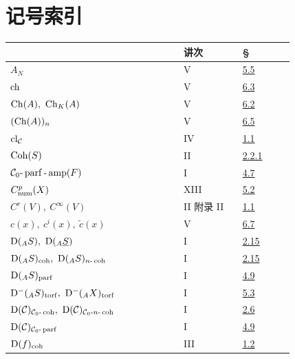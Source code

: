 \newpage
{}\section*{记号索引}
\begingroup\small
\begin{longtable}{@{}>{\raggedright\arraybackslash}p{0.50\linewidth}>{\raggedright\arraybackslash}p{0.17\linewidth}>{\raggedright\arraybackslash}p{0.15\linewidth}@{}}
\toprule
 & 讲次 & §\\
\midrule
\endhead
\(A_N\) & V & \hyperlink{sga6.e05.para.5-5}{5.5}\\
\(\operatorname{ch}\) & V & \hyperlink{sga6.e05.para.6-3}{6.3}\\
\(\Ch(A),\ \Ch_K(A)\) & V & \hyperlink{sga6.e05.def.6-2}{6.2}\\
\((\operatorname{Ch}(A))_n\) & V & \hyperlink{sga6.e05.prop.6-5}{6.5}\\
\(\operatorname{cl}_{\mathcal C}\) & IV & \hyperlink{sga6.e04.para.1-1}{1.1}\\
\(\operatorname{Coh}(S)\) & II & \hyperlink{sga6.e02.notation.2-2-1}{2.2.1}\\
\(\mathcal C_0\text{-}\operatorname{parf}\text{-}\operatorname{amp}(F)\) & I & \hyperlink{sga6.e01.def.4-7}{4.7}\\
\(C^p_{\operatorname{num}}(X)\) & XIII & \hyperlink{sga6.e13.prop.5-2}{5.2}\\
\(C^r(V),\ C^\infty(V)\) & II 附录 II & \hyperlink{sga6.e02.sec.1.1}{1.1}\\
\(c(x),\ c^i(x),\ \widetilde c(x)\) & V & \hyperlink{sga6.e05.para.6-7}{6.7}\\
\(\Dcat({}_A S),\ \Dcat({}_A\underline S)\) & I & \hyperlink{sga6.e01.ex.2-15}{2.15}\\
\(\mathrm D({}_A S)_{\operatorname{coh}},\ \mathrm D({}_A S)_{n\text{-}\operatorname{coh}}\) & I & \hyperlink{sga6.e01.ex.2-15}{2.15}\\
\(\mathrm D({}_A S)_{\operatorname{parf}}\) & I & \hyperlink{sga6.e01.notation.4-9}{4.9}\\
\(\mathrm D^{-}({}_A S)_{\operatorname{torf}},\ \mathrm D^{-}({}_A X)_{\operatorname{torf}}\) & I & \hyperlink{sga6.e01.para.5-3}{5.3}\\
\(\mathrm D(\mathcal C)_{\mathcal C_0\text{-}\operatorname{coh}},\ \mathrm D(\mathcal C)_{\mathcal C_0\text{-}n\text{-}\operatorname{coh}}\) & I & \hyperlink{sga6.e01.schol.2-6}{2.6}\\
\(\mathrm D(\mathcal C)_{\mathcal C_0\text{-}\operatorname{parf}}\) & I & \hyperlink{sga6.e01.notation.4-9}{4.9}\\
\(\mathrm D(f)_{\operatorname{coh}}\) & III & \hyperlink{sga6.e03.def.1-2}{1.2}\\

\end{longtable}
